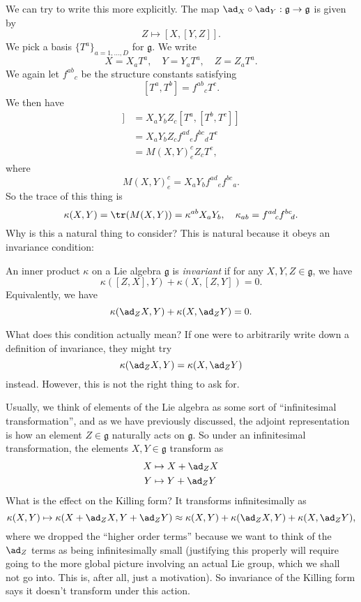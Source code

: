 \documentclass[a4paper]{article}
\begin{document}
We can try to write this more explicitly. The map $\ad_X \circ \ad_Y: \mathfrak{g} \to \mathfrak{g}$ is given by
\[
  Z \mapsto [X, [Y, Z]].
\]
We pick a basis $\{T^a\}_{a = 1, \ldots, D}$ for $\mathfrak{g}$. We write
\[
  X = X_aT^a,\quad Y = Y_aT^a,\quad Z = Z_aT^a.
\]
We again let $f^{ab}\!_c$ be the structure constants satisfying
\[
  [T^a, T^b] = f^{ab}\!_c T^c.
\]
We then have
\begin{align*}
  [X, [Y, Z]] &= X_a Y_b Z_ c [T^a, [T^b, T^c]]\\
  &= X_a Y_b Z_c f^{ad}\!_e f^{bc}\!_d T^e\\
  &= M(X, Y)^c_e Z_c T^e,
\end{align*}
where
\[
  M(X, Y)^c_e = X_a Y_b f^{ad}\!_e f^{bc}\!_a.
\]
So the trace of this thing is
\[
  \kappa(X, Y) = \tr(M(X, Y)) = \kappa^{ab}X_a Y_b,\quad \kappa_{ab} = f^{ad}\!_c f^{bc}\!_d.
\]
Why is this a natural thing to consider? This is natural because it obeys an invariance condition:
\begin{defi}
  An inner product $\kappa$ on a Lie algebra $\mathfrak{g}$ is \emph{invariant} if for any $X, Y, Z \in \mathfrak{g}$, we have
  \[
    \kappa([Z, X], Y)+ \kappa(X, [Z, Y]) = 0.
  \]
  Equivalently, we have
  \[
    \kappa(\ad_Z X, Y) + \kappa(X, \ad_Z Y) = 0.
  \]
\end{defi}
What does this condition actually mean? If one were to arbitrarily write down a definition of invariance, they might try
\[
  \kappa(\ad_Z X, Y) = \kappa(X, \ad_Z Y)
\]
instead. However, this is not the right thing to ask for.

Usually, we think of elements of the Lie algebra as some sort of ``infinitesimal transformation'', and as we have previously discussed, the adjoint representation is how an element $Z \in \mathfrak{g}$ naturally acts on $\mathfrak{g}$. So under an infinitesimal transformation, the elements $X, Y \in \mathfrak{g}$ transform as
\begin{align*}
  X &\mapsto X + \ad_Z X\\
  Y &\mapsto Y + \ad_Z Y
\end{align*}
What is the effect on the Killing form? It transforms infinitesimally as
\[
  \kappa(X, Y) \mapsto \kappa(X + \ad_Z X, Y + \ad_Z Y) \approx \kappa(X, Y) + \kappa(\ad_Z X, Y)+ \kappa(X, \ad_Z Y),
\]
where we dropped the ``higher order terms'' because we want to think of the $\ad_Z$ terms as being infinitesimally small (justifying this properly will require going to the more global picture involving an actual Lie group, which we shall not go into. This is, after all, just a motivation). So invariance of the Killing form says it doesn't transform under this action.
\end{document}
